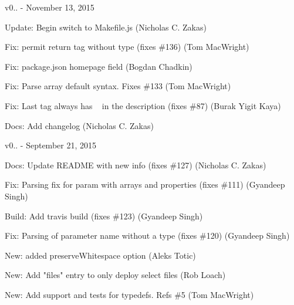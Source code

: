 v0.. -\/ November 13, 2015


\begin{DoxyItemize}
\item Update\+: Begin switch to Makefile.\+js (Nicholas C. Zakas)
\item Fix\+: permit return tag without type (fixes \#136) (Tom Mac\+Wright)
\item Fix\+: package.\+json homepage field (Bogdan Chadkin)
\item Fix\+: Parse array default syntax. Fixes \#133 (Tom Mac\+Wright)
\item Fix\+: Last tag always has ~\newline
 in the description (fixes \#87) (Burak Yigit Kaya)
\item Docs\+: Add changelog (Nicholas C. Zakas)
\end{DoxyItemize}

v0.. -\/ September 21, 2015


\begin{DoxyItemize}
\item Docs\+: Update README with new info (fixes \#127) (Nicholas C. Zakas)
\item Fix\+: Parsing fix for param with arrays and properties (fixes \#111) (Gyandeep Singh)
\item Build\+: Add travis build (fixes \#123) (Gyandeep Singh)
\item Fix\+: Parsing of parameter name without a type (fixes \#120) (Gyandeep Singh)
\item New\+: added preserve\+Whitespace option (Aleks Totic)
\item New\+: Add "{}files"{} entry to only deploy select files (Rob Loach)
\item New\+: Add support and tests for typedefs. Refs \#5 (Tom Mac\+Wright) 
\end{DoxyItemize}